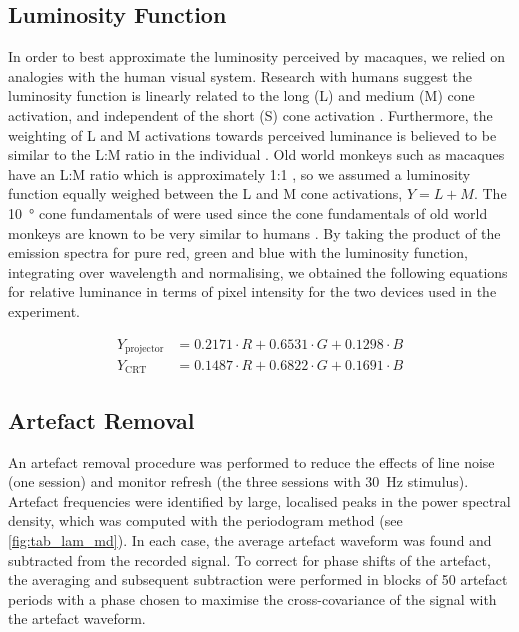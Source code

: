 \subsection{Luminosity Function}

In order to best approximate the luminosity perceived by macaques, we relied on analogies with the human visual system.
Research with humans suggest the luminosity function is linearly related to the long (L) and medium (M) cone activation, and independent of the short (S) cone activation \citep{Stockman2008}.
Furthermore, the weighting of L and M activations towards perceived luminance is believed to be similar to the L:M ratio in the individual \citep{Stockman2008}.
Old world monkeys such as macaques have an L:M ratio which is approximately 1:1 \citep{Dobkins2000}, so we assumed a luminosity function equally weighed between the L and M cone activations, $Y=L+M$.
The \SI{10}{\degree} cone fundamentals of \cite{Stockman2000} were used since the cone fundamentals of old world monkeys are known to be very similar to humans \citep{Dobkins2000}.
By taking the product of the emission spectra for pure red, green and blue with the luminosity function, integrating over wavelength and normalising, we obtained the following equations for relative luminance in terms of pixel intensity for the two devices used in the experiment.

\begin{align*}
    Y_{\text{projector}} &= 0.2171 \cdot R + 0.6531 \cdot G + 0.1298 \cdot B\\
    Y_{\text{CRT}}       &= 0.1487 \cdot R + 0.6822 \cdot G + 0.1691 \cdot B
\end{align*}


\subsection{Artefact Removal}

An artefact removal procedure was performed to reduce the effects of line noise (one session) and monitor refresh (the three sessions with \SI{30}{Hz} stimulus).
Artefact frequencies were identified by large, localised peaks in the power spectral density, which was computed with the periodogram method (see \autoref{fig:tab_lam_md}).
In each case, the average artefact waveform was found and subtracted from the recorded signal.
To correct for phase shifts of the artefact, the averaging and subsequent subtraction were performed in blocks of 50 artefact periods with a phase chosen to maximise the cross-covariance of the signal with the artefact waveform.


